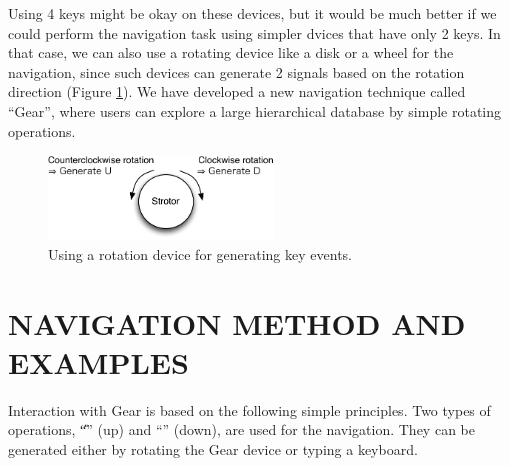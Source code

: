 \documentclass{article}
\begin{document}


Using 4 keys might be okay on these devices, but it would be much better
if we could perform the navigation task using simpler dvices that have only 2 keys.
In that case, we can also use a rotating device like a disk or a wheel for the navigation,
since such devices can generate 2 signals based on the rotation direction (Figure \ref{rotation}).
%
%
We have developed a new navigation technique called ``{Gear}'',
where users can explore a large hierarchical database by simple rotating operations.

\begin{figure}[H]
\centerline{\includegraphics[width=60mm,bb=0 0 294 110]{figures/rotation.pdf}}
\caption{Using a rotation device for generating key events.}
\label{rotation}
\end{figure}

\section*{NAVIGATION METHOD AND EXAMPLES}

Interaction with Gear is based on the following simple principles.
Two types of operations, ``{\U}'' (up) and ``{\D}'' (down), are used for the navigation.
They can be generated either by rotating the Gear device or typing a keyboard.
\end{document}
